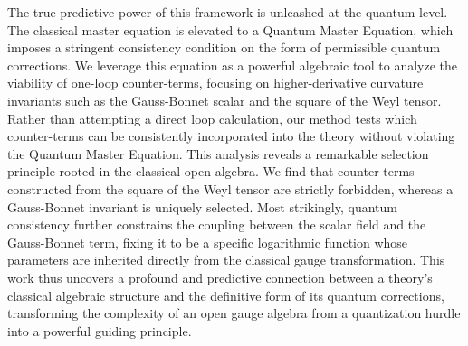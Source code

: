 \documentclass[twocolumn]{aastex631}
\begin{document}
The true predictive power of this framework is unleashed at the quantum level. The classical master equation is elevated to a Quantum Master Equation, which imposes a stringent consistency condition on the form of permissible quantum corrections. We leverage this equation as a powerful algebraic tool to analyze the viability of one-loop counter-terms, focusing on higher-derivative curvature invariants such as the Gauss-Bonnet scalar and the square of the Weyl tensor. Rather than attempting a direct loop calculation, our method tests which counter-terms can be consistently incorporated into the theory without violating the Quantum Master Equation. This analysis reveals a remarkable selection principle rooted in the classical open algebra. We find that counter-terms constructed from the square of the Weyl tensor are strictly forbidden, whereas a Gauss-Bonnet invariant is uniquely selected. Most strikingly, quantum consistency further constrains the coupling between the scalar field and the Gauss-Bonnet term, fixing it to be a specific logarithmic function whose parameters are inherited directly from the classical gauge transformation. This work thus uncovers a profound and predictive connection between a theory's classical algebraic structure and the definitive form of its quantum corrections, transforming the complexity of an open gauge algebra from a quantization hurdle into a powerful guiding principle.
\end{document}
